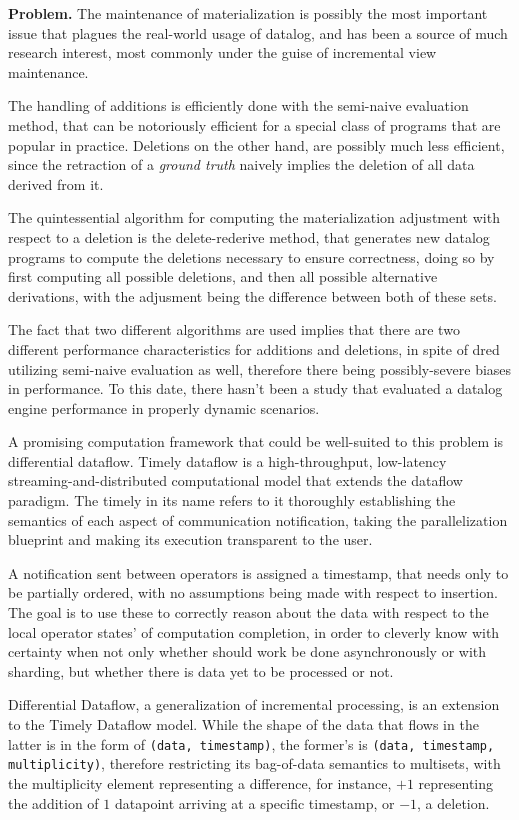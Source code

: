 \documentclass[manuscript,screen,review]{acmart}
\theoremstyle{definition}
\begin{document}
\textbf{Problem.} The maintenance of materialization is possibly the most important issue
that plagues the real-world usage of datalog, and has been a source of much research interest,
most commonly under the guise of incremental view maintenance.

The handling of additions is efficiently done with the semi-naive evaluation method\cite{sne},
that can be notoriously efficient for a special class of programs that are popular in practice.
Deletions on the other hand, are possibly much less efficient, since the retraction of a \textit{ground truth}
naively implies the deletion of all data derived from it.

The quintessential algorithm for computing the materialization adjustment with respect to a
deletion is the delete-rederive\cite{dred} method, that generates new datalog programs to
compute the deletions necessary to ensure correctness, doing so by first computing all possible
deletions, and then all possible alternative derivations, with the adjusment being the difference
between both of these sets.

The fact that two different algorithms are used implies that there are two different performance
characteristics for additions and deletions, in spite of dred utilizing semi-naive evaluation as well,
therefore there being possibly-severe biases in performance. To this date, there hasn't been
a study that evaluated a datalog engine performance in properly dynamic scenarios.

A promising computation framework that could be well-suited to this problem is differential
dataflow\cite{differential_dataflow}. Timely dataflow is a high-throughput, low-latency
streaming-and-distributed computational model that extends the dataflow paradigm. The timely
in its name refers to it thoroughly establishing the semantics of each aspect of communication
notification, taking the parallelization blueprint and making its execution transparent to the user.

A notification sent between operators is assigned a timestamp, that needs only to be partially
ordered, with no assumptions being made with respect to insertion. The goal is to use these to
correctly reason about the data with respect to the local operator states' of computation completion, in order to cleverly know with certainty when not only whether should work be done asynchronously
or with sharding, but whether there is data yet to be processed or not.

Differential Dataflow, a generalization of incremental processing, is an extension to the
Timely Dataflow model. While the shape of the data that flows in the latter is in the form
of \verb|(data, timestamp)|, the former's is \verb|(data, timestamp, multiplicity)|, therefore
restricting its bag-of-data semantics to multisets, with the multiplicity element representing a
difference, for instance, $+1$ representing the addition of $1$ datapoint arriving at a
specific timestamp, or $-1$, a deletion.
\end{document}
